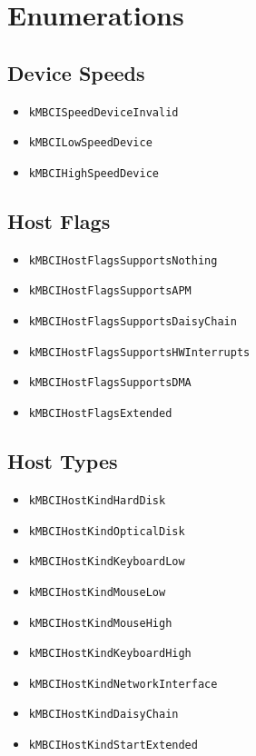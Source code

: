 \documentclass{article}
\begin{document}
\section{Enumerations}

\subsection*{Device Speeds}
\begin{itemize}
  \item \texttt{kMBCISpeedDeviceInvalid}
  \item \texttt{kMBCILowSpeedDevice}
  \item \texttt{kMBCIHighSpeedDevice}
\end{itemize}

\subsection*{Host Flags}
\begin{itemize}
  \item \texttt{kMBCIHostFlagsSupportsNothing}
  \item \texttt{kMBCIHostFlagsSupportsAPM}
  \item \texttt{kMBCIHostFlagsSupportsDaisyChain}
  \item \texttt{kMBCIHostFlagsSupportsHWInterrupts}
  \item \texttt{kMBCIHostFlagsSupportsDMA}
  \item \texttt{kMBCIHostFlagsExtended}
\end{itemize}

\subsection*{Host Types}
\begin{itemize}
  \item \texttt{kMBCIHostKindHardDisk}
  \item \texttt{kMBCIHostKindOpticalDisk}
  \item \texttt{kMBCIHostKindKeyboardLow}
  \item \texttt{kMBCIHostKindMouseLow}
  \item \texttt{kMBCIHostKindMouseHigh}
  \item \texttt{kMBCIHostKindKeyboardHigh}
  \item \texttt{kMBCIHostKindNetworkInterface}
  \item \texttt{kMBCIHostKindDaisyChain}
  \item \texttt{kMBCIHostKindStartExtended}
\end{itemize}
\end{document}
